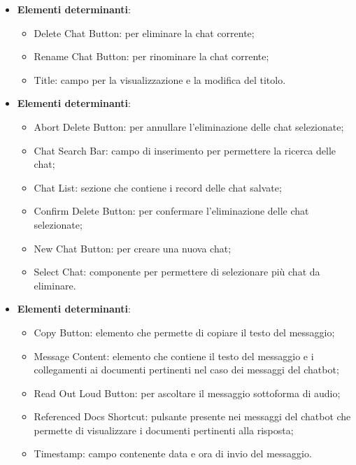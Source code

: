 \documentclass[10pt, a4paper]{article}
\begin{document}
\label{ChatHeaderDettaglio}
\begin{itemize}
    \item \textbf{Elementi determinanti}:
    \begin{itemize}
        \item Delete Chat Button: per eliminare la chat corrente;
        \item Rename Chat Button: per rinominare la chat corrente;
        \item Title: campo per la visualizzazione e la modifica del titolo.
    \end{itemize}

\end{itemize}


\label{ChatListSideBarDettaglio}
\begin{itemize}
    \item \textbf{Elementi determinanti}:
    \begin{itemize}
        \item Abort Delete Button: per annullare l'eliminazione delle chat selezionate;
        \item Chat Search Bar: campo di inserimento per permettere la ricerca delle chat;
        \item Chat List: sezione che contiene i record delle chat salvate;
        \item Confirm Delete Button: per confermare l'eliminazione delle chat selezionate;
        \item New Chat Button: per creare una nuova chat;
        \item Select Chat: componente per permettere di selezionare più chat da eliminare.
    \end{itemize}
\end{itemize}


\label{MessageCardDettaglio}
\begin{itemize}
    \item \textbf{Elementi determinanti}:
    \begin{itemize}
        \item Copy Button: elemento che permette di copiare il testo del messaggio;
        \item Message Content: elemento che contiene il testo del messaggio e i collegamenti ai documenti pertinenti nel caso dei messaggi del chatbot;
        \item Read Out Loud Button: per ascoltare il messaggio sottoforma di audio;
        \item Referenced Docs Shortcut: pulsante  presente nei messaggi del chatbot che permette di visualizzare i documenti pertinenti alla risposta;
        \item Timestamp: campo contenente data e ora di invio del messaggio.
    \end{itemize}
\end{itemize}
\end{document}
